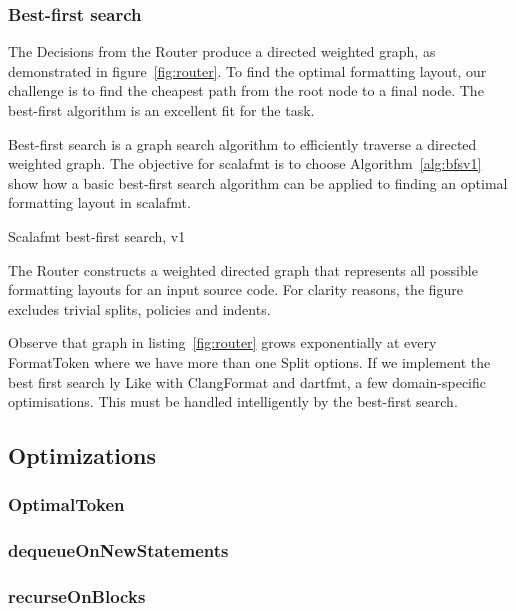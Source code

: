 \subsubsection{Best-first search}
The Decisions from the Router produce a directed weighted graph, as demonstrated in figure~\ref{fig:router}.
To find the optimal formatting layout, our challenge is to find the cheapest path from the root node to a final node.
The best-first\autocite{pearl_heuristics:_1984} algorithm is an excellent fit for the task.

Best-first search is a graph search algorithm to efficiently traverse a directed weighted graph.
The objective for scalafmt is to choose
Algorithm~\ref{alg:bfsv1} show how a basic best-first search algorithm can be applied to finding an optimal formatting layout in scalafmt.
\begin{algorithm}
\caption{Scalafmt best-first search, v1}\label{alg:bfsv1}
  
\end{algorithm}


The Router constructs a weighted directed graph that represents all possible formatting layouts for an input source code.
For clarity reasons, the figure excludes trivial splits, policies and indents.

Observe that graph in listing~\ref{fig:router} grows exponentially at every FormatToken where we have more than one Split options.
If we implement the best first search \naive{}ly
Like with ClangFormat and dartfmt, a few domain-specific optimisations.
This must be handled intelligently by the best-first search.

\subsection{Optimizations}
\subsubsection{OptimalToken}\label{sec:optimal}
\subsubsection{dequeueOnNewStatements}
\subsubsection{recurseOnBlocks}
